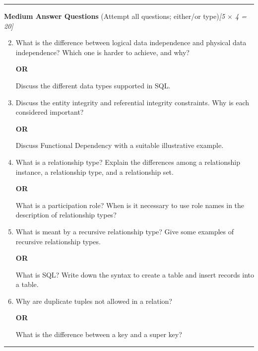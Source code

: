 \documentclass[11pt,a4paper]{article}
\newcommand{\pts}[1]{\hfill   \textit{[#1]}}
\begin{document}
\rule{\linewidth}{0.4pt}\smallskip




\noindent   \textbf{Medium Answer Questions} (Attempt all questions; either/or type)\pts{5 $ \times$ 4 = 20}

\begin{enumerate}[label=\arabic*.,leftmargin=*,itemsep=12pt]
  \setcounter{enumi}{1}
  \item What is the difference between logical data independence and physical data independence? Which one is harder to achieve, and why?
  
\begin{center}   \textbf{OR}\end{center}
  Discuss the different data types supported in SQL.
  \item Discuss the entity integrity and referential integrity constraints. Why is each considered important?
  
\begin{center}   \textbf{OR}\end{center}
  Discuss Functional Dependency with a suitable illustrative example.
  \item What is a relationship type? Explain the differences among a relationship instance, a relationship type, and a relationship set.
  
\begin{center}   \textbf{OR}\end{center}
  What is a participation role? When is it necessary to use role names in the description of relationship types?
  \item What is meant by a recursive relationship type? Give some examples of recursive relationship types.
  
\begin{center}   \textbf{OR}\end{center}
  What is SQL? Write down the syntax to create a table and insert records into a table.
  \item Why are duplicate tuples not allowed in a relation?
  
\begin{center}   \textbf{OR}\end{center}
  What is the difference between a key and a super key?
\end{enumerate}

\bigskip



\rule{\linewidth}{0.4pt}\smallskip
\end{document}
